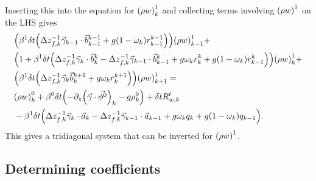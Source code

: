 \documentclass[11pt]{article}
\begin{document}
Inserting this into the equation for $\qty(\rho w)^1_k$ and collecting terms involving $\qty(\rho w)^1$ on the LHS gives
\begin{align*}
& \qty(\beta^1 \delta t \qty(\Delta z_{f,k}^{-1} \vec{\gamma}_{k-1} \cdot \vec{b}^{k-1}_{k-1} + g \qty(1 - \omega_k) r^{k-1}_{k-1}))\qty(\rho w)^1_{k-1} + \\
& \qty(1 + \beta^1 \delta t \qty(\Delta z_{f,k}^{-1} \vec{\gamma}_k \cdot \vec{b}^k_k - \Delta z_{f,k}^{-1} \vec{\gamma}_{k-1} \cdot \vec{b}_{k-1}^k + g \omega_k r^k_k + g \qty(1 - \omega_k) r^k_{k-1} )) \qty(\rho w)^1_k + \\
& \qty(\beta^1 \delta t \qty(\Delta z_{f,k}^{-1} \vec{\gamma}_k \vec{b}^{k+1}_k + g \omega_k r^{k+1}_k)) \qty(\rho w)^1_{k+1} = \\
& \qty(\rho w)^0_k + \beta^0 \delta t \qty(-\partial_z \qty(\vec{\gamma} \cdot \vec{\phi^0} )_k - g \rho^0_k) + \delta t R_{w,k}^t \\
&- \beta^1 \delta t \qty(\Delta z_{f,k}^{-1} \vec{\gamma}_k \cdot \vec{a}_k - \Delta z_{f,k}^{-1} \vec{\gamma}_{k-1} \cdot \vec{a}_{k-1} + g \omega_k q_k + g \qty(1 - \omega_k) q_{k-1}).
\end{align*}
This gives a tridiagonal system that can be inverted for $\qty(\rho w)^1$.

\subsection{Determining coefficients}
\end{document}
